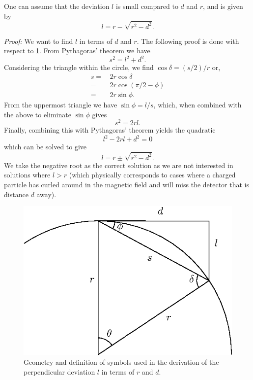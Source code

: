 \documentclass[a4paper, 12pt]{article}
\begin{document}
One can assume that the deviation $l$ is small compared to $d$ and $r$, and is given by 
\begin{equation}
  \boxed{
  l =  r - \sqrt{r^2 - d^2}.
}
\end{equation}


\emph{Proof:} We want to find $l$ in terms of $d$ and $r$. 
The following proof is done with respect to \cref{fig:geometry}.
From Pythagoras' theorem we have 
\begin{equation}
  s^2 = l^2 + d^2.
\end{equation}
Considering the triangle within the circle, we find
$\cos \delta = (s/2)/r$
or, 
\begin{align}
  s = &\, 2r \cos \delta \\
    = &\, 2r \cos (\pi/2 - \phi) \\ 
    = &\, 2r \sin \phi. 
\end{align}
From the uppermost triangle we have $\sin \phi = l / s$, which, when combined with the above to eliminate $\sin \phi$ gives
\begin{equation}
  s^2 = 2rl.
\end{equation}
Finally, combining this with Pythagoras' theorem yields the quadratic
\begin{equation}
  l^2 - 2rl + d^2 = 0
\end{equation}
which can be solved to give
\begin{equation}
  l = r \pm \sqrt{r^2 - d^2}.
\end{equation}
We take the negative root as the correct solution as we are not interested in solutions where $l > r$ (which physically corresponds to cases where a charged particle has curled around in the magnetic
field and will miss the detector that is distance $d$ away). 


\begin{figure}
  \centering
  \includegraphics[width=0.4\linewidth]{images/geometry.eps}
  \caption{Geometry and definition of symbols used in the derivation of the perpendicular deviation $l$ in terms of $r$ and $d$. }
  \label{fig:geometry}
\end{figure}
\end{document}
